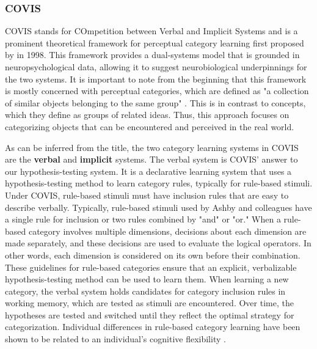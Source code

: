 \documentclass[../dissertation.tex]{subfiles}
\begin{document}
\subsubsection{COVIS}
COVIS stands for COmpetition between Verbal and Implicit Systems and is a prominent theoretical framework for perceptual category learning first proposed by \citeauthor{Ashby1998} in 1998. This framework provides a dual-systems model that is grounded in neuropsychological data, allowing it to suggest neurobiological underpinnings for the two systems. It is important to note from the beginning that this framework is mostly concerned with perceptual categories, which are defined as "a collection of similar objects belonging to the same group" \citep[~p. 151]{Ashby2005}. This is in contrast to concepts, which they define as groups of related ideas. Thus, this approach focuses on categorizing objects that can be encountered and perceived in the real world. \par
	As can be inferred from the title, the two category learning systems in COVIS are the \textbf{verbal} and \textbf{implicit} systems. The verbal system is COVIS' answer to our hypothesis-testing system. It is a declarative learning system that uses a hypothesis-testing method to learn category rules, typically for rule-based stimuli. Under COVIS, rule-based stimuli must have inclusion rules that are easy to describe verbally. Typically, rule-based stimuli used by Ashby and colleagues have a single rule for inclusion or two rules combined by "and" or "or."  When a rule-based category involves multiple dimensions, decisions about each dimension are made separately, and these decisions are used to evaluate the logical operators. In other words, each dimension is considered on its own before their combination. These guidelines for rule-based categories ensure that an explicit, verbalizable hypothesis-testing method can be used to learn them. When learning a new category, the verbal system holds candidates for category inclusion rules in working memory, which are tested as stimuli are encountered. Over time, the hypotheses are tested and switched until they reflect the optimal strategy for categorization. Individual differences in rule-based category learning have been shown to be related to an individual's cognitive flexibility \citep{Reetzke2016}. \par
\end{document}
